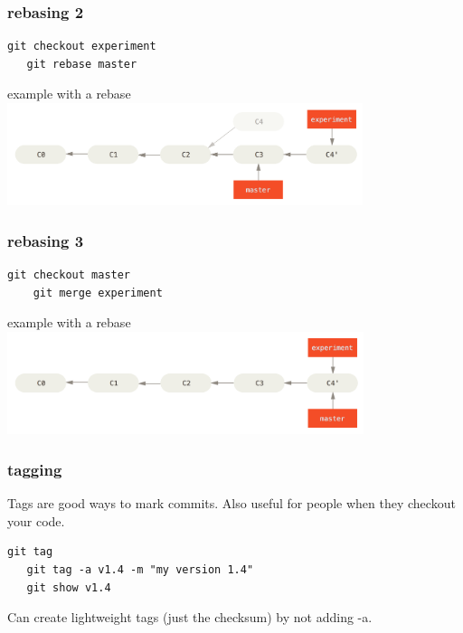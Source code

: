 \documentclass{beamer}
\begin{document}
\begin{frame}[fragile]
  \frametitle{rebasing 2}
  
  \begin{lstlisting}[caption=rebase] 
   git checkout experiment
   git rebase master
  \end{lstlisting}

  \begin{block}{example with a rebase}
    \includegraphics[height=3cm]{basic-rebase-3.png}
  \end{block}

\end{frame}

\begin{frame}[fragile]
  \frametitle{rebasing 3}
  
  \begin{lstlisting}[caption=rebase] 
    git checkout master
    git merge experiment
  \end{lstlisting}

  \begin{block}{example with a rebase}
    \includegraphics[height=3cm]{basic-rebase-4.png}
  \end{block}

\end{frame}



\begin{frame}[fragile]
  \frametitle{tagging}
  Tags are good ways to mark commits. Also useful for people when they checkout your code. 

  \begin{lstlisting}[caption=tagging] 
   git tag
   git tag -a v1.4 -m "my version 1.4"
   git show v1.4
  \end{lstlisting}

  Can create lightweight tags (just the checksum) by not adding -a.

\end{frame}
\end{document}
